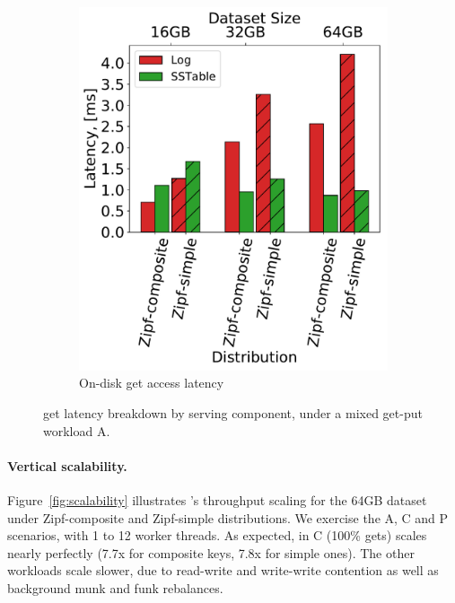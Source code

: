 {\begin{figure}[htb]
\begin{subfigure}{0.49\linewidth}
\includegraphics[width=\textwidth]{figs/Latency_A.pdf}
\caption{On-disk get access latency}
\label{fig:readstat:lat}
\end{subfigure}
\caption{{\sys\/ get latency breakdown by serving component, under a mixed get-put workload A.}}
\label{fig:readstat}
\end{figure}

\paragraph{Vertical scalability.} 
Figure~\ref{fig:scalability} illustrates \sys's throughput scaling for the 64GB dataset under Zipf-composite and Zipf-simple  
distributions. We exercise the A, C and P scenarios, with 1 to 12 worker threads.  
As expected, in C (100\% gets) \sys\/ scales nearly perfectly (7.7x for composite keys, 7.8x for simple ones). 
The other workloads scale slower, due to read-write and write-write contention as well as background munk and funk rebalances. 

}
